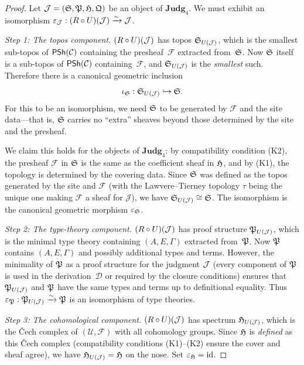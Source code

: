 \begin{proof}
Let $\mathcal{J} = (\mathfrak{S}, \mathfrak{P}, \mathfrak{H}, \mathfrak{Q})$ be an object of
$\mathbf{Judg}_4$.  We must exhibit an isomorphism
$\varepsilon_{\mathcal{J}} : (R \circ U)(\mathcal{J}) \xrightarrow{\sim} \mathcal{J}$.

\emph{Step 1: The topos component.}
$(R \circ U)(\mathcal{J})$ has topos $\mathfrak{S}_{U(\mathcal{J})}$, which is the smallest
sub-topos of $\mathsf{PSh}(\mathcal{C})$ containing the presheaf~$\mathcal{F}$
extracted from~$\mathfrak{S}$.  Now $\mathfrak{S}$ itself is a sub-topos of
$\mathsf{PSh}(\mathcal{C})$ containing~$\mathcal{F}$, and $\mathfrak{S}_{U(\mathcal{J})}$ is
the \emph{smallest} such.  Therefore there is a canonical geometric
inclusion
\[
  \iota_{\mathfrak{S}} : \mathfrak{S}_{U(\mathcal{J})} \hookrightarrow \mathfrak{S}.
\]
For this to be an isomorphism, we need $\mathfrak{S}$ to be generated by
$\mathcal{F}$ and the site data---that is, $\mathfrak{S}$ carries no
``extra'' sheaves beyond those determined by the site and the
presheaf.

We claim this holds for the objects of $\mathbf{Judg}_4$: by
compatibility condition (K2), the presheaf $\mathcal{F}$ in $\mathfrak{S}$
is the same as the coefficient sheaf in $\mathfrak{H}$, and by (K1), the
topology is determined by the covering data.  Since $\mathfrak{S}$ was
defined as the topos generated by the site and $\mathcal{F}$ (with
the Lawvere--Tierney topology $\tau$ being the unique one making
$\mathcal{F}$ a sheaf for $\mathcal{J}$), we have
$\mathfrak{S}_{U(\mathcal{J})} \cong \mathfrak{S}$.  The isomorphism is the canonical
geometric morphism $\varepsilon_{\mathfrak{S}}$.

\emph{Step 2: The type-theory component.}
$(R \circ U)(\mathcal{J})$ has proof structure $\mathfrak{P}_{U(\mathcal{J})}$, which is the
minimal type theory containing $(A, E, \Gamma)$ extracted
from~$\mathfrak{P}$.  Now $\mathfrak{P}$ contains $(A, E, \Gamma)$ and possibly
additional types and terms.  However, the minimality of $\mathfrak{P}$ as a
proof structure for the judgment $\mathcal{J}$ (every component of $\mathfrak{P}$ is
used in the derivation~$\mathcal{D}$ or required by the closure
conditions) ensures that $\mathfrak{P}_{U(\mathcal{J})}$ and $\mathfrak{P}$ have the same
types and terms up to definitional equality.  Thus
$\varepsilon_{\mathfrak{P}} : \mathfrak{P}_{U(\mathcal{J})} \xrightarrow{\sim} \mathfrak{P}$
is an isomorphism of type theories.

\emph{Step 3: The cohomological component.}
$(R \circ U)(\mathcal{J})$ has spectrum $\mathfrak{H}_{U(\mathcal{J})}$, which is the
\v{C}ech complex of $(\mathcal{U}, \mathcal{F})$ with all cohomology
groups.  Since $\mathfrak{H}$ is \emph{defined} as this \v{C}ech complex
(compatibility conditions (K1)--(K2) ensure the cover and sheaf
agree), we have $\mathfrak{H}_{U(\mathcal{J})} = \mathfrak{H}$ on the nose.
Set $\varepsilon_{\mathfrak{H}} = \mathrm{id}$.


\end{proof}
